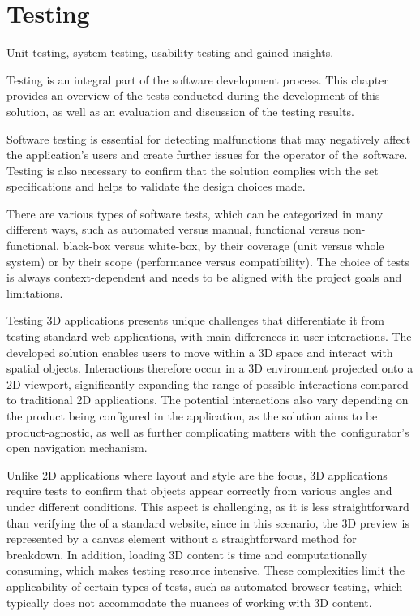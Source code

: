 \chapter{Testing}

\begin{chapterabstract}
    Unit testing, system testing, usability testing and gained insights.
\end{chapterabstract}

Testing is an integral part of the software development process. This chapter provides an overview of the tests conducted during the development of this solution, as well as an evaluation and discussion of the testing results.

Software testing is essential for detecting malfunctions that may negatively affect the application's users and create further issues for the operator of the~software. Testing is also necessary to confirm that the solution complies with the set specifications and helps to validate the design choices made.~\cite{Homes2012}

There are various types of software tests, which can be categorized in many different ways, such as automated versus manual, functional versus non-functional, black-box versus white-box, by their coverage (unit versus whole system) or by their scope (performance versus compatibility). The choice of tests is always context-dependent and needs to be aligned with the project goals and limitations.~\cite{Krysik2023}

Testing 3D applications presents unique challenges that differentiate it from testing standard web applications, with main differences in user interactions. The developed solution enables users to move within a 3D space and interact with spatial objects. Interactions therefore occur in a 3D environment projected onto a 2D viewport, significantly expanding the range of possible interactions compared to traditional 2D applications. The potential interactions also vary depending on the product being configured in the application, as the solution aims to be product-agnostic, as well as further complicating matters with the~configurator's open navigation mechanism.

Unlike 2D applications where layout and style are the focus, 3D applications require tests to confirm that objects appear correctly from various angles and under different conditions. This aspect is challenging, as it is less straightforward than verifying the  of a standard website, since in this scenario, the 3D preview is represented by a canvas element without a straightforward method for breakdown. In addition, loading 3D content is time and computationally consuming, which makes testing resource intensive. These complexities limit the applicability of certain types of tests, such as automated browser testing, which typically does not accommodate the nuances of working with 3D content.

